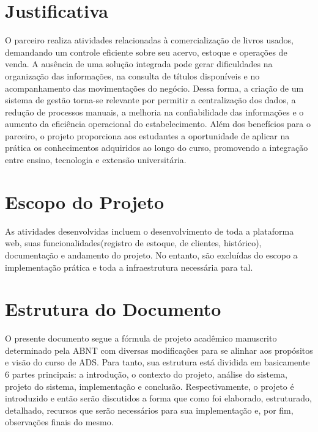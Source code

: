 \section{Justificativa}
O parceiro realiza atividades relacionadas à comercialização de livros usados, demandando um controle eficiente sobre seu acervo, estoque e operações de venda. A ausência de uma solução integrada pode gerar dificuldades na organização das informações, na consulta de títulos disponíveis e no acompanhamento das movimentações do negócio. Dessa forma, a criação de um sistema de gestão torna-se relevante por permitir a centralização dos dados, a redução de processos manuais, a melhoria na confiabilidade das informações e o aumento da eficiência operacional do estabelecimento. Além dos benefícios para o parceiro, o projeto proporciona aos estudantes a oportunidade de aplicar na prática os conhecimentos adquiridos ao longo do curso, promovendo a integração entre ensino, tecnologia e extensão universitária.

\section{Escopo do Projeto}
As atividades desenvolvidas incluem o desenvolvimento de toda a plataforma web, suas funcionalidades(registro de estoque, de clientes, histórico), documentação e andamento do projeto. No entanto, são excluídas do escopo a implementação prática e toda a infraestrutura necessária para tal.

\section{Estrutura do Documento}
O presente documento segue a fórmula de projeto acadêmico manuscrito determinado pela ABNT \cite{de2011associaccao} com diversas modificações para se alinhar aos propósitos e visão do curso de ADS. Para tanto, sua estrutura está dividida em basicamente 6 partes principais: a introdução, o contexto do projeto, análise do sistema, projeto do sistema, implementação e conclusão. Respectivamente, o projeto é introduzido e então serão discutidos a forma que como foi elaborado, estruturado, detalhado, recursos que serão necessários para sua implementação e, por fim, observações finais do mesmo.
